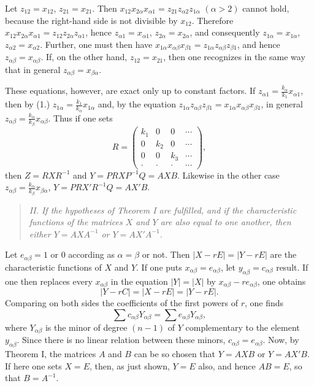 \documentclass[11pt]{article}
\begin{document}
Let $z_{12}=x_{12}$, $z_{21}=x_{21}$. Then $x_{12}x_{2\alpha}x_{\alpha1}=z_{21}z_{\alpha2}z_{1\alpha}$ $(\alpha>2)$ cannot hold, because the right-hand side is not divisible by $x_{12}$. Therefore $x_{12}x_{2\alpha}x_{\alpha1}=z_{12}z_{2\alpha}z_{\alpha1}$, hence $z_{\alpha1}=x_{\alpha1}$, $z_{2\alpha}=x_{2\alpha}$, and consequently $z_{1\alpha}=x_{1\alpha}$, $z_{\alpha2}=x_{\alpha2}$. Further, one must then have $x_{1\alpha}x_{\alpha\beta}x_{\beta1}=z_{1\alpha}z_{\alpha\beta}z_{\beta1}$, and hence $z_{\alpha\beta}=x_{\alpha\beta}$. If, on the other hand, $z_{12}=x_{21}$, then one recognizes in the same way that in general $z_{\alpha\beta}=x_{\beta\alpha}$.

These equations, however, are exact only up to constant factors. If $z_{\alpha1}=\frac{k_\alpha}{k_1}x_{\alpha1}$, then by (1.) $z_{1\alpha}=\frac{k_1}{k_\alpha}x_{1\alpha}$ and, by the equation $z_{1\alpha}z_{\alpha\beta}z_{\beta1}=x_{1\alpha}x_{\alpha\beta}x_{\beta1}$, in general $z_{\alpha\beta}=\frac{k_\alpha}{k_\beta}x_{\alpha\beta}$. Thus if one sets
\[
R=\begin{pmatrix}
k_1&0&0&\cdots\\
0&k_2&0&\cdots\\
0&0&k_3&\cdots\\
\cdot&\cdot&\cdot&\cdots
\end{pmatrix},
\]
then $Z=RXR^{-1}$ and $Y=PRXP^{-1}Q=AXB$. Likewise in the other case $z_{\alpha\beta}=\frac{k_\alpha}{k_\beta}x_{\beta\alpha}$, $Y=PRX'R^{-1}Q=AX'B$.

\begin{quote}\itshape
II. If the hypotheses of Theorem I are fulfilled, and if the characteristic functions of the matrices $X$ and $Y$ are also equal to one another, then either $Y=AXA^{-1}$ or $Y=AX'A^{-1}$.
\end{quote}

Let $e_{\alpha\beta}=1$ or 0 according as $\alpha=\beta$ or not. Then $|X-rE|=|Y-rE|$ are the characteristic functions of $X$ and $Y$. If one puts $x_{\alpha\beta}=e_{\alpha\beta}$, let $y_{\alpha\beta}=c_{\alpha\beta}$ result. If one then replaces every $x_{\alpha\beta}$ in the equation $|Y|=|X|$ by $x_{\alpha\beta}-re_{\alpha\beta}$, one obtains
\[
|Y-rC|=|X-rE|=|Y-rE|.
\]
Comparing on both sides the coefficients of the first powers of $r$, one finds
\[
\sum c_{\alpha\beta}Y_{\alpha\beta}=\sum e_{\alpha\beta}Y_{\alpha\beta},
\]
where $Y_{\alpha\beta}$ is the minor of degree $(n-1)$ of $Y$ complementary to the element $y_{\alpha\beta}$. Since there is no linear relation between these minors, $c_{\alpha\beta}=e_{\alpha\beta}$. Now, by Theorem I, the matrices $A$ and $B$ can be so chosen that $Y=AXB$ or $Y=AX'B$. If here one sets $X=E$, then, as just shown, $Y=E$ also, and hence $AB=E$, so that $B=A^{-1}$.
\end{document}
